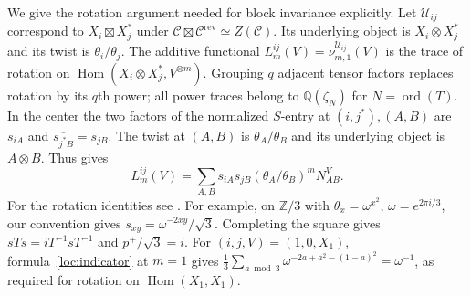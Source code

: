 \documentclass[11pt,a4paper]{article}
\numberwithin{equation}{section}
\newcommand{\QQ}{\mathbb Q}
\begin{document}
We give the rotation argument needed for block invariance explicitly.
Let $\mathcal U_{ij}$ correspond to $X_i\boxtimes X_j^*$ under
$\mathcal C\boxtimes\mathcal C^{\mathrm{rev}}\simeq Z(\mathcal C)$.
Its underlying object is $X_i\otimes X_j^*$ and its twist is
$\theta_i/\theta_j$. The additive functional
$L_m^{ij}(V)=\nu_{m,1}^{\mathcal U_{ij}}(V)$ is the trace of rotation
on $\operatorname{Hom}(X_i\otimes X_j^*,V^{\otimes m})$.
Grouping $q$ adjacent tensor factors replaces rotation by its $q$th power;
all power traces belong to $\QQ(\zeta_N)$ for $N=\operatorname{ord}(T)$.
In the center the two factors of the normalized $S$-entry at
$(i,j^*),(A,B)$ are $s_{iA}$ and $\overline{s_{j^*B}}=s_{jB}$.
The twist at $(A,B)$ is $\theta_A/\theta_B$ and its underlying
object is $A\otimes B$. Thus \cite[Proposition~6.1]{NSind} gives
\begin{equation}\label{loc:indicator}
 L_m^{ij}(V)=\sum_{A,B}s_{iA}s_{jB}
                     (\theta_A/\theta_B)^mN_{AB}^{V}.
\end{equation}
For the rotation identities see \cite[Lemmas~2.5 and~2.7,
Propositions~2.8 and~5.7]{NSind}.
For example, on $\mathbb Z/3$ with $\theta_x=\omega^{x^2}$,
$\omega=e^{2\pi i/3}$, our convention gives
$s_{xy}=\omega^{-2xy}/\sqrt3$. Completing the square gives
$sTs=iT^{-1}sT^{-1}$ and $p^+/\sqrt3=i$.
For $(i,j,V)=(1,0,X_1)$, formula~\eqref{loc:indicator} at $m=1$ gives
$\frac13\sum_{a\bmod 3}\omega^{-2a+a^2-(1-a)^2}=\omega^{-1}$,
as required for rotation on $\operatorname{Hom}(X_1,X_1)$.
\end{document}

